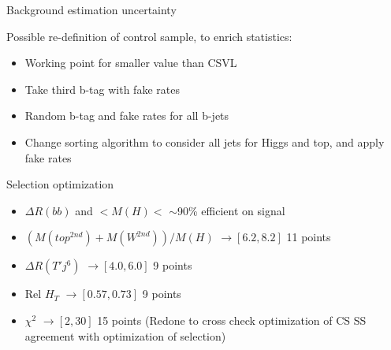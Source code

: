 \begin{frame}{Background estimation uncertainty}
\vspace{-.2cm}

\begin{block}{}
  \scriptsize \centering Possible re-definition of control sample, to enrich statistics:
  \begin{itemize}
  \item Working point for smaller value than CSVL
  \item Take third b-tag with fake rates
  \item Random b-tag and fake rates for all b-jets
  \item Change sorting algorithm to consider all jets for Higgs and top, and apply fake rates
  \end{itemize}
\end{block}

\end{frame}

\begin{frame}{Selection optimization}
\vspace{-.2cm}

\begin{block}{}
  \scriptsize \centering 
  \begin{itemize}
  \item $\Delta R(bb)$ and $<M(H)<$ $\sim$90\% efficient on signal
  \item $(M(top^{2nd})+M(W^{2nd}))/M(H)$ $\to [6.2,8.2]$ 11 points
  \item $\Delta R (T' j^{6})$ $\to [4.0,6.0]$ 9 points 
  \item Rel $H_{T}$ $\to [0.57,0.73]$ 9 points
  \item $\chi^{2}$ $\to [2,30]$ 15 points (Redone to cross check optimization of CS SS agreement with optimization of selection)
  \end{itemize}
\end{block}

\end{frame}
{

}



